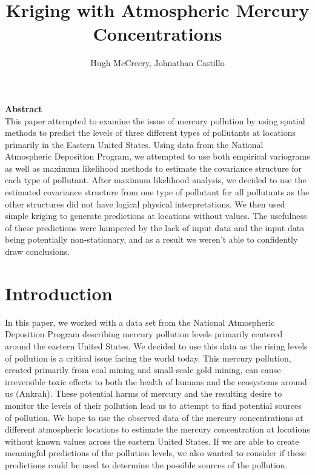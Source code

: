 \documentclass[12pt,a4]{article}
\theoremstyle{plain} %
\begin{document}
\author{Hugh McCreery, Johnathan Castillo}
\title{Kriging with Atmospheric Mercury Concentrations}
\maketitle

\noindent \textbf{\Large Abstract} \\
This paper attempted to examine the issue of mercury pollution by using spatial methods to predict the levels of three different types of pollutants at locations primarily in the Eastern United States. Using data from the National Atmospheric Deposition Program, we attempted to use both empirical variograms as well as maximum likelihood methods to estimate the covariance structure for each type of pollutant. After maximum likelihood analysis, we decided to use the estimated covariance structure from one type of pollutant for all pollutants as the other structures did not have logical physical interpretations. We then used simple kriging to generate predictions at locations without values. The usefulness of these predictions were hampered by the lack of input data and the input data being potentially non-stationary, and as a result we weren't able to confidently draw conclusions.

\newpage
{
\hypersetup{linkcolor = black}
\tableofcontents
}
\newpage

\section{Introduction}

In this paper, we worked with a data set from the National Atmospheric Deposition Program describing mercury pollution levels primarily centered around the eastern United States. We decided to use this data as the rising levels of pollution is a critical issue facing the world today. This mercury pollution, created primarily from coal mining and small-scale gold mining, can cause irreversible toxic effects to both the health of humans and the ecosystems around us (Ankrah). These potential harms of mercury and the resulting desire to monitor the levels of their pollution lead us to attempt to find potential sources of pollution. We hope to use the observed data of the mercury concentrations at different atmospheric locations to estimate the mercury concentration at locations without known values across the eastern United States. If we are able to create meaningful predictions of the pollution levels, we also wanted to consider if these predictions could be used to determine the possible sources of the pollution.
\end{document}
